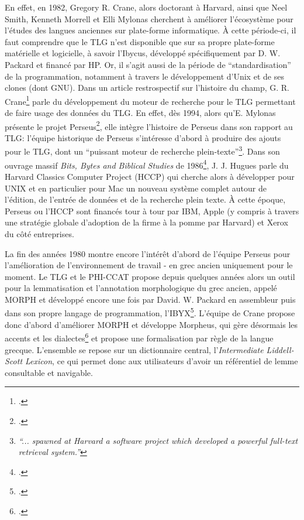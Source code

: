 En effet, en 1982, Gregory R. Crane, alors doctorant à Harvard, ainsi que Neel Smith, Kenneth Morrell et Elli Mylonas cherchent à améliorer l'écosystème pour l'études des langues anciennes sur plate-forme informatique. À cette période-ci, il faut comprendre que le TLG n'est disponible que sur sa propre plate-forme matérielle et logicielle, à savoir l'Ibycus, développé spécifiquement par D. W. Packard et financé par HP. Or, il s'agit aussi de la période de \enquote{standardisation} de la programmation, notamment à travers le développement d'Unix et de ses clones (dont GNU). Dans un article restrospectif sur l'histoire du champ, G. R. Crane\footcite{schreibman_classics_2004} parle du développement du moteur de recherche pour le TLG permettant de faire usage des données du TLG. En effet, dès 1994, alors qu'E. Mylonas présente le projet Perseus\footcite{mylonas_perseus_1993}, elle intègre l'histoire de Perseus dans son rapport au TLG: l'équipe historique de Perseus s'intéresse d'abord à produire des ajouts pour le TLG, dont un \enquote{puissant moteur de recherche plein-texte}\footnote{\textit{\enquote{... spawned at Harvard a software project which developed a powerful full-text retrieval system.}}}. Dans son ouvrage massif \textit{Bits, Bytes and Biblical Studies} de 1986\footcite[p. 598]{hughes_bits_1987}, J. J. Hugues parle du Harvard Classics Computer Project (HCCP) qui cherche alors à développer pour UNIX et en particulier pour Mac un nouveau système complet autour de l'édition, de l'entrée de données et de la recherche plein texte. À cette époque, Perseus ou l'HCCP sont financés tour à tour par IBM, Apple (y compris à travers une stratégie globale d'adoption de la firme à la pomme par Harvard) et Xerox du côté entreprises.

La fin des années 1980 montre encore l'intérêt d'abord de l'équipe Perseus pour l'amélioration de l'environnement de travail - en grec ancien uniquement pour le moment. Le TLG et le PHI-CCAT propose depuis quelques années alors un outil pour la lemmatisation et l'annotation morphologique du grec ancien, appelé MORPH et développé encore une fois par David. W. Packard en assembleur puis dans son propre langage de programmation, l'IBYX\footcite[p.554-555]{hughes_bits_1987}. L'équipe de Crane propose donc d'abord d'améliorer MORPH et développe Morpheus, qui gère désormais les accents et les dialectes\footcite{mylonas_perseus_1993} et propose une formalisation par règle de la langue grecque. L'ensemble se repose sur un dictionnaire central, l'\textit{Intermediate Liddell-Scott Lexicon}, ce qui permet donc aux utilisateurs d'avoir un référentiel de lemme consultable et navigable.

